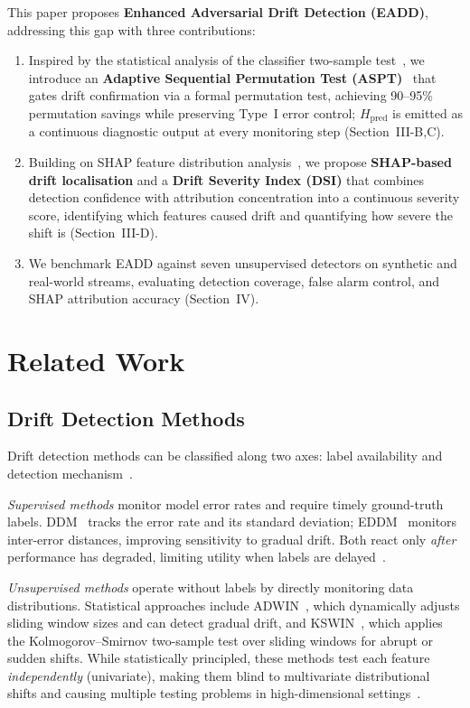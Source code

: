 \documentclass[conference,a4paper]{IEEEtran}
\begin{document}
This paper proposes \textbf{Enhanced Adversarial Drift Detection (EADD)}, addressing this gap with three contributions:
\begin{enumerate}
    \item Inspired by the statistical analysis of the classifier two-sample test~\cite{b19,b27}, we introduce an \textbf{Adaptive Sequential Permutation Test (ASPT)}~\cite{b30} that gates drift confirmation via a formal permutation test, achieving 90--95\% permutation savings while preserving Type~I error control; $H_{\text{pred}}$ is emitted as a continuous diagnostic output at every monitoring step (Section~III-B,C).
    \item Building on SHAP feature distribution analysis~\cite{b24}, we propose \textbf{SHAP-based drift localisation} and a \textbf{Drift Severity Index (DSI)} that combines detection confidence with attribution concentration into a continuous severity score, identifying which features caused drift and quantifying how severe the shift is (Section~III-D).
    \item We benchmark EADD against seven unsupervised detectors on synthetic and real-world streams, evaluating detection coverage, false alarm control, and SHAP attribution accuracy (Section~IV).
\end{enumerate}

\section{Related Work}

\subsection{Drift Detection Methods}

Drift detection methods can be classified along two axes: label availability and detection mechanism~\cite{b1,b2}.

\textit{Supervised methods} monitor model error rates and require timely ground-truth labels. DDM~\cite{b8} tracks the error rate and its standard deviation; EDDM~\cite{b11} monitors inter-error distances, improving sensitivity to gradual drift. Both react only \textit{after} performance has degraded, limiting utility when labels are delayed~\cite{b1,b5}.

\textit{Unsupervised methods} operate without labels by directly monitoring data distributions. Statistical approaches include ADWIN~\cite{b12}, which dynamically adjusts sliding window sizes and can detect gradual drift, and KSWIN~\cite{b7}, which applies the Kolmogorov--Smirnov two-sample test over sliding windows for abrupt or sudden shifts. While statistically principled, these methods test each feature \textit{independently} (univariate), making them blind to multivariate distributional shifts and causing multiple testing problems in high-dimensional settings~\cite{b6}.
\end{document}
